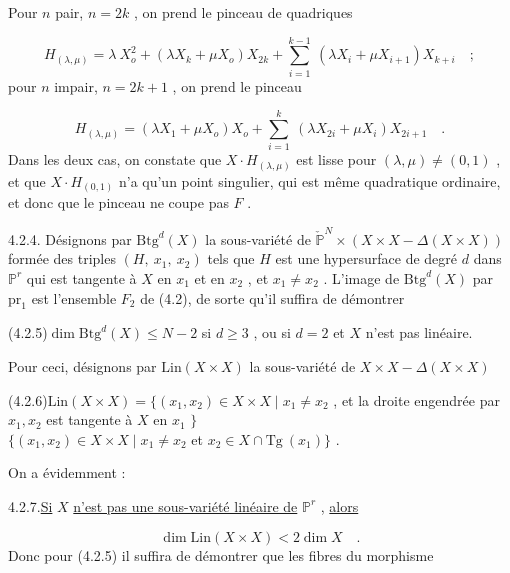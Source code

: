 Pour $n$ pair, $n = 2k$ , on prend le pinceau de quadriques

\begin{equation}\tag{4.2.2}
H_{(\lambda,\mu)} = \lambda\ X_o^2 + (\lambda X_k + \mu X_o) X_{2k} + \sum_{i=1}^{k-1}\ (\lambda X_i + \mu X_{i+1}) X_{k+i} \quad ;
\end{equation}
pour $n$ impair, $n = 2k+1$ , on prend le pinceau

\begin{equation}\tag{4.2.3}
H_{(\lambda,\mu)} = (\lambda X_1 + \mu X_o) X_o + \sum_{i=1}^{k}\ (\lambda X_{2i} + \mu X_i) X_{2i+1} \quad .
\end{equation}
Dans les deux cas, on constate que $X \cdot H_{(\lambda,\mu)}$ est lisse pour $(\lambda,\mu) \neq (0,1)$ , et que $X \cdot H_{(0,1)}$ n'a qu'un point singulier, qui est même quadratique ordinaire, et donc que le pinceau ne coupe pas $F$ .

4.2.4. Désignons par $\mathrm{Btg}^d(X)$ la sous-variété de $\check{\mathbb{P}}^N \times (X \times X - \Delta(X \times X))$ formée des triples $(H,\ x_1,\ x_2)$ tels que $H$ est une hypersurface de degré $d$ dans $\mathbb{P}^r$ qui est tangente à $X$ en $x_1$ et en $x_2$ , et $x_1 \neq x_2$ . L'image de $\mathrm{Btg}^d(X)$ par $\mathrm{pr}_1$ est l'ensemble $F_2$ de (4.2), de sorte qu'il suffira de démontrer

(4.2.5)\quad $\dim \mathrm{Btg}^d(X) \leq N-2$ si $d \geq 3$ , ou si $d = 2$ et $X$ n'est pas linéaire.

Pour ceci, désignons par $\mathrm{Lin}(X \times X)$ la sous-variété de $X \times X - \Delta(X \times X)$

(4.2.6)\quad $\mathrm{Lin}(X \times X) = \{(x_1,x_2) \in X \times X \mid x_1 \neq x_2$ , et la droite engendrée par $x_1,x_2$ est tangente à $X$ en $x_1$ $\}$ \\ $\{(x_1,x_2) \in X \times X \mid x_1 \neq x_2$ et $x_2 \in X \cap \mathrm{Tg}\ (x_1)\}$ .



On a évidemment :

4.2.7.\quad \underline{Si} $X$ \underline{n'est pas une sous-variété linéaire de} $\mathbb{P}^r$ , \underline{alors}

\begin{equation*}
\dim \mathrm{Lin}(X \times X) < 2\dim X \quad .
\end{equation*}
Donc pour (4.2.5) il suffira de démontrer que les fibres du morphisme

